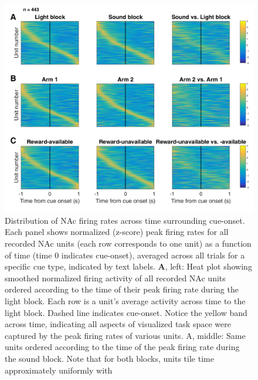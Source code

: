 \documentclass[11pt]{article}
\newcommand{\bsf}[1]{\textbf{#1}}
\providecommand{\DIFadd}[1]{{\protect\color{red} \sf #1}} %
\providecommand{\DIFdel}[1]{} %
\providecommand{\DIFaddFL}[1]{\DIFadd{#1}} %
\providecommand{\DIFdelFL}[1]{\DIFdel{#1}} %
\providecommand{\DIFaddbeginFL}{} %
\providecommand{\DIFaddendFL}{} %
\providecommand{\DIFdelbeginFL}{} %
\providecommand{\DIFdelendFL}{} %
\newcommand{\DIFscaledelfig}{0.5}
\newlength{\DIFdelgraphicswidth} %
\newlength{\DIFdelgraphicsheight} %
\newcommand{\DIFaddincludegraphics}[2][]{{\color{red}\fbox{\DIFOincludegraphics[#1]{#2}}}} %
\newcommand{\DIFdelincludegraphics}[2][]{%
\sbox{\DIFdelgraphicsbox}{\DIFOincludegraphics[#1]{#2}}%
\settoboxwidth{\DIFdelgraphicswidth}{\DIFdelgraphicsbox} %
\settoboxtotalheight{\DIFdelgraphicsheight}{\DIFdelgraphicsbox} %
\scalebox{\DIFscaledelfig}{%
\parbox[b]{\DIFdelgraphicswidth}{\usebox{\DIFdelgraphicsbox}\\[-\baselineskip] \rule{\DIFdelgraphicswidth}{0em}}\llap{\resizebox{\DIFdelgraphicswidth}{\DIFdelgraphicsheight}{%
\setlength{\unitlength}{\DIFdelgraphicswidth}%
\begin{picture}(1,1)%
\thicklines\linethickness{2pt} %
{\color[rgb]{1,0,0}\put(0,0){\framebox(1,1){}}}%
{\color[rgb]{1,0,0}\put(0,0){\line( 1,1){1}}}%
{\color[rgb]{1,0,0}\put(0,1){\line(1,-1){1}}}%
\end{picture}%
}\hspace*{3pt}}} %
} %
\DeclareRobustCommand{\DIFaddbeginFL}{\DIFOaddbeginFL \let\includegraphics\DIFaddincludegraphics} %
\DeclareRobustCommand{\DIFaddendFL}{\DIFOaddendFL \let\includegraphics\DIFOincludegraphics} %
\DeclareRobustCommand{\DIFdelbeginFL}{\DIFOdelbeginFL \let\includegraphics\DIFdelincludegraphics} %
\DeclareRobustCommand{\DIFdelendFL}{\DIFOaddendFL \let\includegraphics\DIFOincludegraphics} %
\begin{document}
 \begin{figure}[ht!]
\centering
\DIFdelbeginFL %
\DIFdelendFL \DIFaddbeginFL \includegraphics[width=\textwidth]{Fig 5 - Task tiling.pdf}
\DIFaddendFL \caption{Distribution of NAc firing rates across time surrounding \DIFdelbeginFL \DIFdelFL{cue
onset}\DIFdelendFL \DIFaddbeginFL \DIFaddFL{cue-onset}\DIFaddendFL . Each panel shows normalized (z-score) \DIFaddbeginFL \DIFaddFL{peak }\DIFaddendFL firing rates for all recorded NAc
units (each row corresponds to one unit) as a function of time (time 0
indicates \DIFdelbeginFL \DIFdelFL{cue onset}\DIFdelendFL \DIFaddbeginFL \DIFaddFL{cue-onset}\DIFaddendFL ), averaged across all trials for a specific cue type,
indicated by text labels. \DIFdelbeginFL \DIFdelFL{\bsf{A-C}: Heat plots aligned to normalized peak
firing rates. }\DIFdelendFL \bsf{A}, left: Heat plot showing smoothed normalized firing
activity of all recorded NAc units ordered according to the time of their peak
firing rate during the light block. Each row is a unit’s average activity
across time to the light block. Dashed line indicates \DIFdelbeginFL \DIFdelFL{cue onset}\DIFdelendFL \DIFaddbeginFL \DIFaddFL{cue-onset}\DIFaddendFL . Notice the
yellow band across time, indicating all aspects of visualized task space were
captured by the peak firing rates of various units. A, middle: Same units
ordered according to the time of the peak firing rate during the sound
block. Note that for both blocks, units tile time approximately uniformly with
}
\end{figure}
\end{document}
